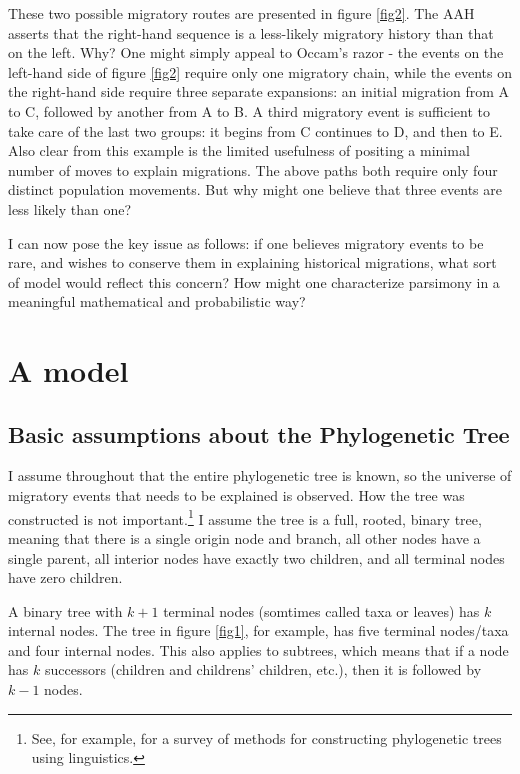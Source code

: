 \documentclass[11pt]{article}
\begin{document}
These two possible migratory routes are presented in figure \ref{fig2}. The AAH asserts that the right-hand sequence is a less-likely migratory history than that on the left. Why? One might simply appeal to Occam's razor - the events on the left-hand side of figure \ref{fig2} require only one migratory chain, while the events on the right-hand side require three separate expansions: an initial migration from A to C, followed by another from A to B. A third migratory event is sufficient to take care of the last two groups: it begins from C continues to D, and then to E. Also clear from this example is the limited usefulness of positing a minimal number of moves to explain migrations. The above paths both require only four distinct population movements. But why might one believe that three events are less likely than one? 



I can now pose the key issue as follows: if one believes migratory events to be rare, and wishes to conserve them in explaining historical migrations, what sort of model would reflect this concern? How might one characterize parsimony in a meaningful mathematical and probabilistic way? 

\section{A model}

\subsection{Basic assumptions about the Phylogenetic Tree}

I assume throughout that the entire phylogenetic tree is known, so the universe of migratory events that needs to be explained is observed. How the  tree was constructed is not important.\footnote{See, for example, \citet{nichols97} for a survey of methods for constructing phylogenetic trees using linguistics.  } I assume the tree is a full, rooted, binary tree, meaning that there is a single origin node and branch, all other nodes have a single parent, all interior nodes have exactly two children, and all terminal nodes have zero children. 

A binary tree with $k+1$ terminal nodes (somtimes called taxa or leaves) has $k$ internal nodes. The tree in figure \ref{fig1}, for example,  has five terminal nodes/taxa  and four internal nodes. This also applies to subtrees, which means that if a node has $k$ successors (children and childrens' children, etc.), then it is followed by $k-1$ nodes.
\end{document}
